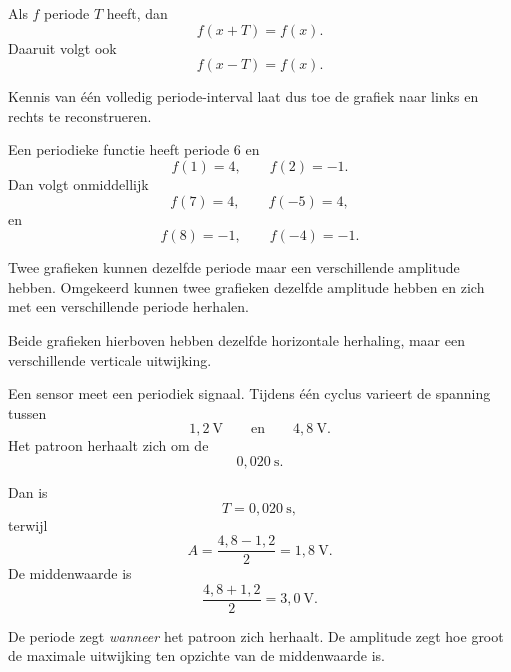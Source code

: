\documentclass{ximera}
\begin{document}

Als \(f\) periode \(T\) heeft, dan
\[
f(x+T)=f(x).
\]
Daaruit volgt ook
\[
f(x-T)=f(x).
\]

Kennis van één volledig periode-interval laat dus toe de grafiek naar links
en rechts te reconstrueren.

\begin{voorbeeld}
Een periodieke functie heeft periode \(6\) en
\[
f(1)=4,\qquad f(2)=-1.
\]
Dan volgt onmiddellijk
\[
f(7)=4,\qquad f(-5)=4,
\]
en
\[
f(8)=-1,\qquad f(-4)=-1.
\]
\end{voorbeeld}


Twee grafieken kunnen dezelfde periode maar een verschillende amplitude hebben.
Omgekeerd kunnen twee grafieken dezelfde amplitude hebben en zich met een
verschillende periode herhalen.

\begin{center}
\end{center}

Beide grafieken hierboven hebben dezelfde horizontale herhaling, maar een
verschillende verticale uitwijking.


Een sensor meet een periodiek signaal. Tijdens één cyclus varieert de spanning
tussen
\[
1{,}2\ \mathrm{V}
\qquad\text{en}\qquad
4{,}8\ \mathrm{V}.
\]
Het patroon herhaalt zich om de
\[
0{,}020\ \mathrm{s}.
\]

Dan is
\[
T=0{,}020\ \mathrm{s},
\]
terwijl
\[
A=\frac{4{,}8-1{,}2}{2}=1{,}8\ \mathrm{V}.
\]
De middenwaarde is
\[
\frac{4{,}8+1{,}2}{2}=3{,}0\ \mathrm{V}.
\]

De periode zegt \emph{wanneer} het patroon zich herhaalt.
De amplitude zegt hoe groot de maximale uitwijking ten opzichte van de
middenwaarde is.
\end{document}
